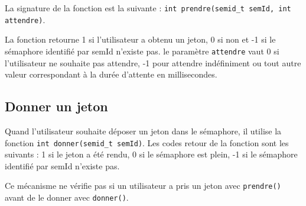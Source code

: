 La signature de la fonction est la suivante : \texttt{int prendre(semid_t semId, int attendre)}.

La fonction retourne 1 si l'utilisateur a obtenu un jeton, 0 si non et -1 si le sémaphore identifié par semId n'existe pas. le paramètre \texttt{attendre} vaut 0 si l'utilisateur ne souhaite pas attendre, -1 pour attendre indéfiniment ou tout autre valeur correspondant à la durée d'attente en millisecondes.

\subsection{Donner un jeton}
Quand l'utilisateur souhaite déposer un jeton dans le sémaphore, il utilise la fonction \texttt{int donner(semid_t semId)}. Les codes retour de la fonction sont les suivants : 1 si le jeton a été rendu, 0 si le sémaphore est plein, -1 si le sémaphore identifié par semId n'existe pas.

Ce mécanisme ne vérifie pas si un utilisateur a pris un jeton avec \texttt{prendre()} avant de le donner avec \texttt{donner()}.
